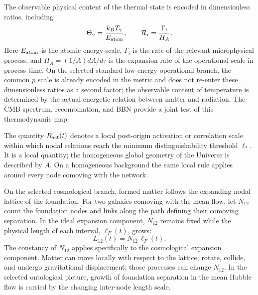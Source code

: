 \documentclass[11pt,a4paper]{article}
\begin{document}
The observable physical content of the thermal state is encoded in dimensionless ratios, including
\begin{equation}
\Theta_\gamma=\frac{k_B T_\gamma}{E_{\rm atom}},
\qquad
\mathcal{R}_i=\frac{\Gamma_i}{H_A}.
\end{equation}
Here $E_{\rm atom}$ is the atomic energy scale, $\Gamma_i$ is the rate of the relevant microphysical process, and $H_A=(1/A)dA/d\tau$ is the expansion rate of the operational scale in process time. On the selected standard low-energy operational branch, the common $p$ scale is already encoded in the metric and does not re-enter these dimensionless ratios as a second factor; the observable content of temperature is determined by the actual energetic relation between matter and radiation. The CMB spectrum, recombination, and BBN provide a joint test of this thermodynamic map.

The quantity $R_{\rm act}(t)$ denotes a local post-origin activation or correlation scale within which nodal relations reach the minimum distinguishability threshold $\ell_*$. It is a local quantity; the homogeneous global geometry of the Universe is described by $A$. On a homogeneous background the same local rule applies around every node comoving with the network.

On the selected cosmological branch, formed matter follows the expanding nodal lattice of the foundation. For two galaxies comoving with the mean flow, let $N_{12}$ count the foundation nodes and links along the path defining their comoving separation. In the ideal expansion component, $N_{12}$ remains fixed while the physical length of each interval, $\ell_F(t)$, grows:
\begin{equation}
L_{12}(t)=N_{12}\,\ell_F(t).
\end{equation}
The constancy of $N_{12}$ applies specifically to the cosmological expansion component. Matter can move locally with respect to the lattice, rotate, collide, and undergo gravitational displacement; those processes can change $N_{12}$. In the selected ontological picture, growth of foundation separation in the mean Hubble flow is carried by the changing inter-node length scale.
\end{document}
